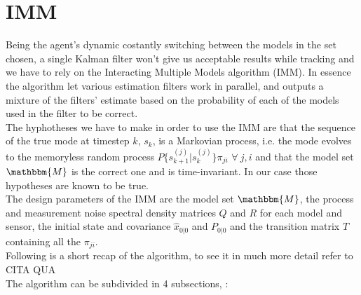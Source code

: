 \documentclass[twocolumn]{article}
\begin{document}
\section*{IMM}
Being the agent's dynamic costantly switching between the models in the set chosen, a single Kalman filter won't give us acceptable results while
tracking and we have to rely on the Interacting Multiple Models algorithm (IMM). In essence the algorithm let various estimation filters work in parallel, and outputs a mixture of the filters' estimate based on the probability of each of the models used in the filter to be correct.
\\
The hyphotheses we have to make in order to use the IMM are that the sequence of the true mode at timestep $k$, $s_{k}$, is a Markovian process, i.e. the mode evolves to the
memoryless random process $P\{s_{k+1}^{(j)}|s_{k}^{(j)}\}\pi_{ji}$ $\forall\ j,i$ and that the model set $\mathbbm{M}$ is the correct one and is time-invariant.
In our case those hypotheses are known to be true.
\\
The design parameters of the IMM are the model set $\mathbbm{M}$, the process and measurement noise spectral density
matrices $Q$ and $R$ for each model and sensor, the initial state and covariance $\hat{x}_{0|0}$ and $P_{0|0}$
and the transition matrix $T$ containing all the $\pi_{ji}$.
\\
Following is a short recap of the algorithm, to see it in much more detail refer to CITA QUA
\\
The algorithm can be subdivided in 4 subsections, :
\end{document}
